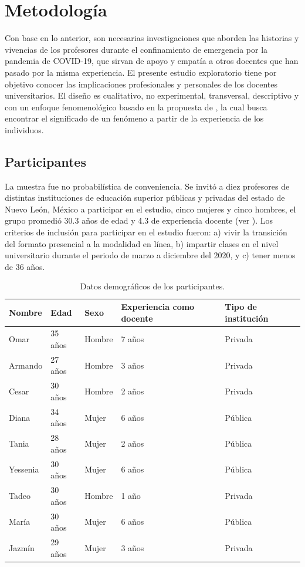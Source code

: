 \documentclass[spanish]{textolivre}
\begin{document}
\section{Metodología}\label{sec-modelo}

Con base en lo anterior, son necesarias investigaciones que aborden las historias y vivencias de los profesores durante el confinamiento de emergencia por la pandemia de COVID-19, que sirvan de apoyo y empatía a otros docentes que han pasado por la misma experiencia. El presente estudio exploratorio tiene por objetivo conocer las implicaciones profesionales y personales de los docentes universitarios. El diseño es cualitativo, no experimental, transversal, descriptivo y con un enfoque fenomenológico basado en la propuesta de \textcite{moustakas_phenomenological_1994}, la cual busca encontrar el significado de un fenómeno a partir de la experiencia de los individuos. 

\subsection{Participantes}

La muestra fue no probabilística de conveniencia. Se invitó a diez profesores de distintas instituciones de educación superior públicas y privadas del estado de Nuevo León, México a participar en el estudio, cinco mujeres y cinco hombres, el grupo promedió 30.3 años de edad y 4.3 de experiencia docente (ver ). Los criterios de inclusión para participar en el estudio fueron: a) vivir la transición del formato presencial a la modalidad en línea, b) impartir clases en el nivel universitario durante el periodo de marzo a diciembre del 2020, y c) tener menos de 36 años. 

\begin{table}[h!]
\centering
\begin{threeparttable}
\caption{Datos demográficos de los participantes.}
\label{Tabla1}
\begin{tabular}{*{5}{l}}
\toprule
Nombre & Edad & Sexo & Experiencia como docente & Tipo de institución \\
\midrule
Omar & 35 años & Hombre & 7 años & Privada \\
Armando & 27 años & Hombre & 3 años &Privada \\
Cesar & 30 años & Hombre & 2 años & Privada \\
Diana & 34 años & Mujer & 6 años & Pública \\
Tania & 28 años & Mujer & 2 años & Pública \\
Yessenia & 30 años & Mujer & 6 años & Pública \\
Tadeo & 30 años & Hombre & 1 año & Privada \\
María & 30 años & Mujer & 6 años & Pública \\
Jazmín & 29 años & Mujer & 3 años & Privada \\
\bottomrule
\end{tabular}
\end{threeparttable}
\end{table}
\end{document}
